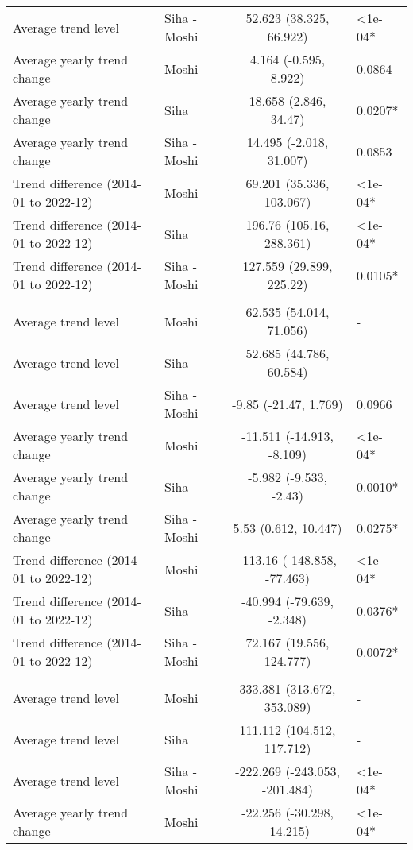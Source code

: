 \begin{longtable}{l|lcl}
Average trend level & Siha - Moshi & 52.623 (38.325, 66.922) & <1e-04* \\ 
Average yearly trend change & Moshi & 4.164 (-0.595, 8.922) & 0.0864 \\ 
Average yearly trend change & Siha & 18.658 (2.846, 34.47) & 0.0207* \\ 
Average yearly trend change & Siha - Moshi & 14.495 (-2.018, 31.007) & 0.0853 \\ 
Trend difference (2014-01 to 2022-12) & Moshi & 69.201 (35.336, 103.067) & <1e-04* \\ 
Trend difference (2014-01 to 2022-12) & Siha & 196.76 (105.16, 288.361) & <1e-04* \\ 
Trend difference (2014-01 to 2022-12) & Siha - Moshi & 127.559 (29.899, 225.22) & 0.0105* \\ 
\midrule\addlinespace[2.5pt]
\multicolumn{4}{l}{Malnutrition} \\ 
\midrule\addlinespace[2.5pt]
Average trend level & Moshi & 62.535 (54.014, 71.056) & - \\ 
Average trend level & Siha & 52.685 (44.786, 60.584) & - \\ 
Average trend level & Siha - Moshi & -9.85 (-21.47, 1.769) & 0.0966 \\ 
Average yearly trend change & Moshi & -11.511 (-14.913, -8.109) & <1e-04* \\ 
Average yearly trend change & Siha & -5.982 (-9.533, -2.43) & 0.0010* \\ 
Average yearly trend change & Siha - Moshi & 5.53 (0.612, 10.447) & 0.0275* \\ 
Trend difference (2014-01 to 2022-12) & Moshi & -113.16 (-148.858, -77.463) & <1e-04* \\ 
Trend difference (2014-01 to 2022-12) & Siha & -40.994 (-79.639, -2.348) & 0.0376* \\ 
Trend difference (2014-01 to 2022-12) & Siha - Moshi & 72.167 (19.556, 124.777) & 0.0072* \\ 
\midrule\addlinespace[2.5pt]
\multicolumn{4}{l}{Neurological} \\ 
\midrule\addlinespace[2.5pt]
Average trend level & Moshi & 333.381 (313.672, 353.089) & - \\ 
Average trend level & Siha & 111.112 (104.512, 117.712) & - \\ 
Average trend level & Siha - Moshi & -222.269 (-243.053, -201.484) & <1e-04* \\ 
Average yearly trend change & Moshi & -22.256 (-30.298, -14.215) & <1e-04* \\ 

\end{longtable}
